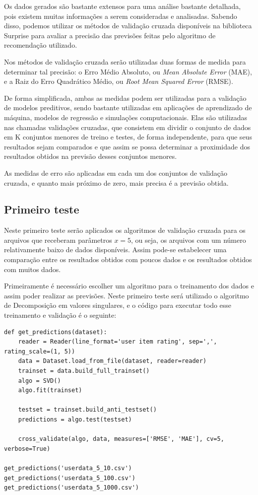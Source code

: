 \documentclass[
	12pt,				%
	oneside,			%
	a4paper,			%
	chapter=TITLE,		%
	english,			%
	french,				%
	spanish,			%
	brazil				%
	]{abntex2}
\begin{document}
Os dados gerados são bastante extensos para uma análise bastante detalhada, pois existem muitas informações a serem consideradas e analisadas. Sabendo disso, podemos utilizar os métodos de validação cruzada disponíveis na biblioteca Surprise para avaliar a precisão das previsões feitas pelo algoritmo de recomendação utilizado.

Nos métodos de validação cruzada serão utilizadas duas formas de medida para determinar tal precisão: o Erro Médio Absoluto, ou \emph{Mean Absolute Error} (MAE), e a Raiz do Erro Quadrático Médio, ou \emph{Root Mean Squared Error} (RMSE).

De forma simplificada, ambas as medidas podem ser utilizadas para a validação de modelos preditivos, sendo bastante utilizadas em aplicações de aprendizado de máquina, modelos de regressão e simulações computacionais. Elas são utilizadas nas chamadas validações cruzadas, que consistem em dividir o conjunto de dados em K conjuntos menores de treino e testes, de forma independente, para que seus resultados sejam comparados e que assim se possa determinar a proximidade dos resultados obtidos na previsão desses conjuntos menores.

As medidas de erro são aplicadas em cada um dos conjuntos de validação cruzada, e quanto mais próximo de zero, mais precisa é a previsão obtida.

\subsection{Primeiro teste}

Neste primeiro teste serão aplicados os algoritmos de validação cruzada para os arquivos que receberam parâmetros $x=5$, ou seja, os arquivos com um número relativamente baixo de dados disponíveis. Assim pode-se estabelecer uma comparação entre os resultados obtidos com poucos dados e os resultados obtidos com muitos dados.

Primeiramente é necessário escolher um algoritmo para o treinamento dos dados e assim poder realizar as previsões. Neste primeiro teste será utilizado o algoritmo de Decomposição em valores singulares, e o código para executar todo esse treinamento e validação é o seguinte:

\begin{verbatim}
def get_predictions(dataset):
    reader = Reader(line_format='user item rating', sep=',', rating_scale=(1, 5))
    data = Dataset.load_from_file(dataset, reader=reader)
    trainset = data.build_full_trainset()
    algo = SVD()
    algo.fit(trainset)

    testset = trainset.build_anti_testset()
    predictions = algo.test(testset)

    cross_validate(algo, data, measures=['RMSE', 'MAE'], cv=5, verbose=True)
    
get_predictions('userdata_5_10.csv')
get_predictions('userdata_5_100.csv')
get_predictions('userdata_5_1000.csv')
\end{verbatim}
\end{document}
